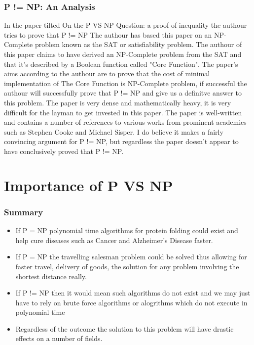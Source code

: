 \documentclass{report}
\begin{document}
\subsection{P != NP: An Analysis}
In the paper tilted On the P VS NP Question: a proof of inequality the authour tries to prove that P != NP\cite{P!=NP} The authour has based this paper on an NP-Complete problem known as the SAT or satisfiability problem\cite{satisfiability}. The authour of this paper claims to have derived an NP-Complete problem from the SAT and that it's described by a Boolean function called "Core Function".  The paper's aims according to the authour are to prove that the cost of minimal implementation of The Core Function is NP-Complete problem, if successful the authour will successfully prove that P != NP and give us a definitve answer to this problem.  The paper is very dense and mathematically heavy, it is very difficult for the layman to get invested in this paper.  The paper is well-written and contains a number of references to various works from prominent academics such as Stephen Cooke and Michael Sisper.  I do believe it makes a fairly convincing argument for P != NP, but regardless the paper doesn't appear to have conclusively proved that P != NP.
\chapter{Importance of P VS NP}
\subsection{Summary}
\begin{itemize}
  \item If P = NP polynomial time algorithms for protein folding could exist and help cure diseases such as Cancer and Alzheimer's Disease faster.
  \item If P = NP the travelling salesman problem could be solved thus allowing for faster travel, delivery of goods, the solution for any problem involving the shortest distance really.
  \item If P != NP then it would mean such algorithms do not exist and we may just have to rely on brute force algorithms or alogrithms which do not execute in polynomial time
  \item Regardless of the outcome the solution to this problem will have drastic effects on a number of fields.
\end{itemize}
\end{document}
